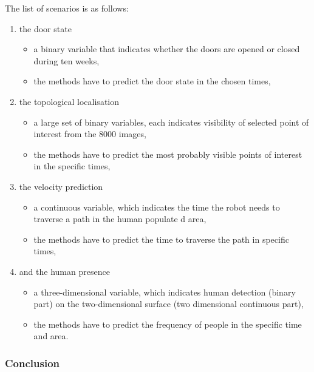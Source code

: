 The list of scenarios is as follows:
\begin{enumerate}
    \item the door state
    \begin{itemize}
        \item a binary variable that indicates whether the doors are opened or closed during ten weeks,
        \item the methods have to predict the door state in the chosen times,
    \end{itemize}
    \item the topological localisation
    \begin{itemize}
        \item a large set of binary variables, each indicates visibility of selected point of interest from the $8000$ images,
        \item the methods have to predict the most probably visible points of interest in the specific times,
    \end{itemize}
    \item the velocity prediction
    \begin{itemize}
        \item a continuous variable, which indicates the time the robot needs to traverse a path in the human populate
d area,
        \item the methods have to predict the time to traverse the path in specific times,
    \end{itemize}
    \item and the human presence
    \begin{itemize}
        \item a three-dimensional variable, which indicates human detection (binary part) on the two-dimensional surface (two dimensional continuous part),
        \item the methods have to predict the frequency of people in the specific time and area.
    \end{itemize}
\end{enumerate}

\subsubsection{Conclusion}
%


